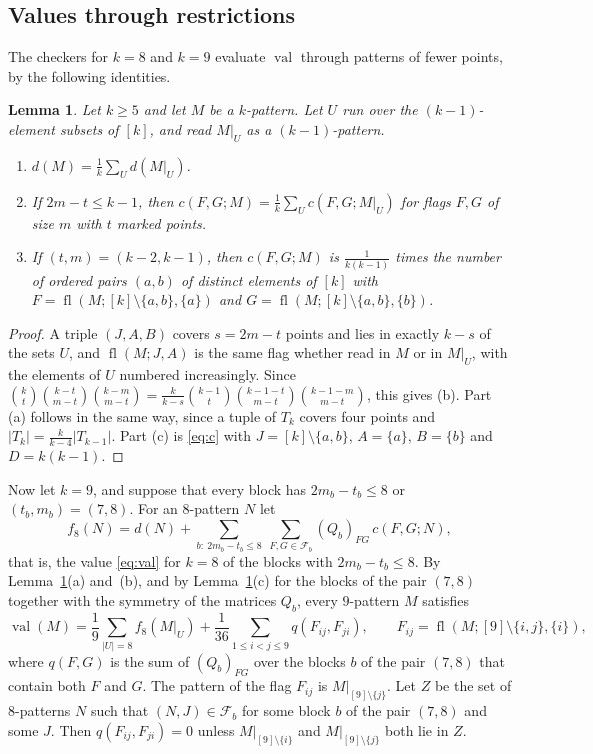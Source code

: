 \documentclass[11pt]{amsart}
\newtheorem{lemma}[theorem]{Lemma}
\theoremstyle{definition}
\theoremstyle{remark}
\numberwithin{equation}{section}
\newcommand{\cF}{\mathcal{F}}
\newcommand{\fl}{\operatorname{fl}}
\newcommand{\val}{\operatorname{val}}
\begin{document}
\subsection{Values through restrictions}\label{sec:restr}
The checkers for $k=8$ and $k=9$ evaluate $\val$ through patterns of fewer points, by the following identities.

\begin{lemma}\label{lem:averaging}
Let $k\ge5$ and let $M$ be a $k$-pattern. Let $U$ run over the $(k-1)$-element subsets of $[k]$, and read $M|_U$ as a $(k-1)$-pattern.
\begin{enumerate}[label=\textup{(\alph*)}]
\item $d(M)=\frac1k\sum_Ud(M|_U)$.
\item If $2m-t\le k-1$, then $c(F,G;M)=\frac1k\sum_Uc(F,G;M|_U)$ for flags $F,G$ of size $m$ with $t$ marked points.
\item If $(t,m)=(k-2,k-1)$, then $c(F,G;M)$ is $\frac1{k(k-1)}$ times the number of ordered pairs $(a,b)$ of distinct elements of $[k]$ with $F=\fl(M;[k]\setminus\{a,b\},\{a\})$ and $G=\fl(M;[k]\setminus\{a,b\},\{b\})$.
\end{enumerate}
\end{lemma}

\begin{proof}
A triple $(J,A,B)$ covers $s=2m-t$ points and lies in exactly $k-s$ of the sets $U$, and $\fl(M;J,A)$ is the same flag whether read in $M$ or in $M|_U$, with the elements of $U$ numbered increasingly. Since $\binom kt\binom{k-t}{m-t}\binom{k-m}{m-t}=\frac k{k-s}\binom{k-1}t\binom{k-1-t}{m-t}\binom{k-1-m}{m-t}$, this gives (b). Part (a) follows in the same way, since a tuple of $T_k$ covers four points and $|T_k|=\frac k{k-4}|T_{k-1}|$. Part (c) is \eqref{eq:c} with $J=[k]\setminus\{a,b\}$, $A=\{a\}$, $B=\{b\}$ and $D=k(k-1)$.
\end{proof}

Now let $k=9$, and suppose that every block has $2m_b-t_b\le8$ or $(t_b,m_b)=(7,8)$. For an $8$-pattern $N$ let
\begin{equation}\label{eq:f8}
f_8(N)=d(N)+\sum_{b:\ 2m_b-t_b\le8}\ \sum_{F,G\in\cF_b}(Q_b)_{FG}\,c(F,G;N),
\end{equation}
that is, the value \eqref{eq:val} for $k=8$ of the blocks with $2m_b-t_b\le8$. By Lemma~\ref{lem:averaging}(a) and~(b), and by Lemma~\ref{lem:averaging}(c) for the blocks of the pair $(7,8)$ together with the symmetry of the matrices $Q_b$, every $9$-pattern $M$ satisfies
\begin{equation}\label{eq:val9}
\val(M)=\frac19\sum_{|U|=8}f_8(M|_U)+\frac1{36}\sum_{1\le i<j\le9}q(F_{ij},F_{ji}),\qquad F_{ij}=\fl(M;[9]\setminus\{i,j\},\{i\}),
\end{equation}
where $q(F,G)$ is the sum of $(Q_b)_{FG}$ over the blocks $b$ of the pair $(7,8)$ that contain both $F$ and $G$. The pattern of the flag $F_{ij}$ is $M|_{[9]\setminus\{j\}}$. Let $Z$ be the set of $8$-patterns $N$ such that $(N,J)\in\cF_b$ for some block $b$ of the pair $(7,8)$ and some $J$. Then $q(F_{ij},F_{ji})=0$ unless $M|_{[9]\setminus\{i\}}$ and $M|_{[9]\setminus\{j\}}$ both lie in $Z$.
\end{document}
